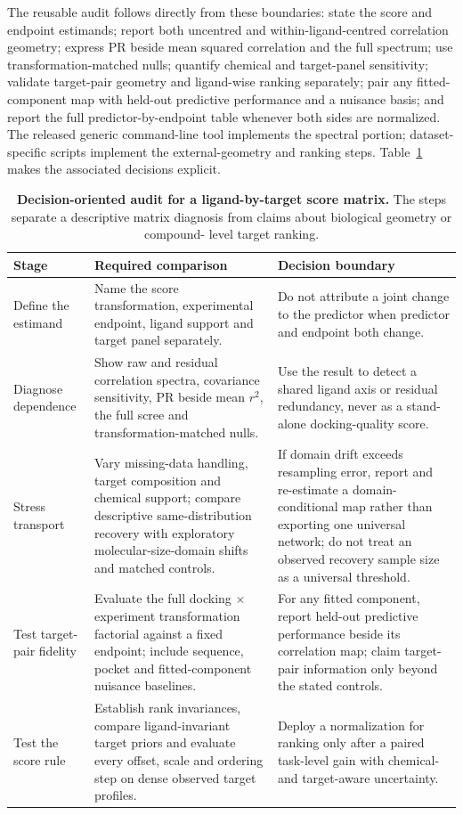 \documentclass[11pt]{article}
\begin{document}
The reusable audit follows directly from these boundaries: state the score and endpoint
estimands; report both uncentred and within-ligand-centred correlation geometry; express PR
beside mean squared correlation and the full spectrum; use transformation-matched nulls;
quantify chemical and target-panel sensitivity; validate target-pair geometry and
ligand-wise ranking separately; pair any fitted-component map with held-out predictive performance and a
nuisance basis; and report the full predictor-by-endpoint table whenever both sides are
normalized. The released generic command-line tool implements the spectral
portion; dataset-specific scripts implement the external-geometry and ranking steps.
Table~\ref{tab:auditprotocol} makes the associated decisions explicit.

\begin{table}[t]
\centering\small\singlespacing
\setlength{\tabcolsep}{4pt}
\caption{\textbf{Decision-oriented audit for a ligand-by-target score matrix.} The steps
separate a descriptive matrix diagnosis from claims about biological geometry or compound-
level target ranking.}
\label{tab:auditprotocol}
\begin{tabular}{p{2.5cm}p{6.0cm}p{6.0cm}}
\toprule
Stage & Required comparison & Decision boundary \\
\midrule
Define the estimand &
Name the score transformation, experimental endpoint, ligand support and target panel
separately. &
Do not attribute a joint change to the predictor when predictor and endpoint both change. \\
Diagnose dependence &
Show raw and residual correlation spectra, covariance sensitivity, PR beside mean $r^2$,
the full scree and transformation-matched nulls. &
Use the result to detect a shared ligand axis or residual redundancy, never as a stand-alone
docking-quality score. \\
Stress transport &
Vary missing-data handling, target composition and chemical support; compare descriptive
same-distribution recovery with exploratory molecular-size-domain shifts and matched controls. &
If domain drift exceeds resampling error, report and re-estimate a domain-conditional map
rather than exporting one universal network; do not treat an observed recovery sample size
as a universal threshold. \\
Test target-pair fidelity &
Evaluate the full docking $\times$ experiment transformation factorial against a fixed
endpoint; include sequence, pocket and fitted-component nuisance baselines. &
For any fitted component, report held-out predictive performance beside its correlation map;
claim target-pair information only beyond the stated controls. \\
Test the score rule &
Establish rank invariances, compare ligand-invariant target priors and evaluate every offset,
scale and ordering step on dense observed target profiles. &
Deploy a normalization for ranking only after a paired task-level gain with chemical- and
target-aware uncertainty. \\
\bottomrule
\end{tabular}
\end{table}
\end{document}
